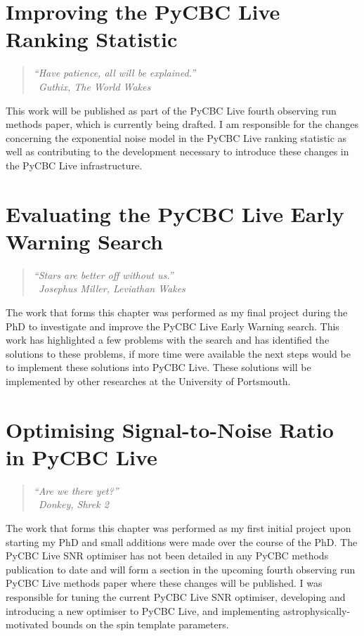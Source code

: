 \documentclass[a4paper,12pt,twoside]{report} %
\makeatletter
\newcommand{\chapterquote}[2]{
  \begin{quote}
    \color{darkgray}\itshape #1 \\[1ex] %
    \raggedleft %
    \textemdash\ #2
  \end{quote}
}
\renewcommand{\cleardoublepage}{%
  \clearpage%
  \if@twoside
    \ifodd\c@page
    \else
      \hbox{}%
      \thispagestyle{empty}%
      \newpage
    \fi
  \fi
}
\let\oldchapter\chapter
\renewcommand{\chapter}{\cleardoublepage\oldchapter}
\makeatother
\begin{document}
\chapter[Improving the PyCBC Live Ranking Statistic]{\label{chapter:5-pycbc-live}Improving the PyCBC Live Ranking Statistic}
\chapterquote{``Have patience, all will be explained.''}{Guthix, The World Wakes}
This work will be published as part of the PyCBC Live fourth observing run methods paper, which is currently being drafted. I am responsible for the changes concerning the exponential noise model in the PyCBC Live ranking statistic as well as contributing to the development necessary to introduce these changes in the PyCBC Live infrastructure.


\chapter[Evaluating the PyCBC Live Early Warning Search]{\label{chapter:6-earlywarning}Evaluating the PyCBC Live Early Warning Search}
\chapterquote{``Stars are better off without us.''}{Josephus Miller, Leviathan Wakes}
The work that forms this chapter was performed as my final project during the PhD to investigate and improve the PyCBC Live Early Warning search. This work has highlighted a few problems with the search and has identified the solutions to these problems, if more time were available the next steps would be to implement these solutions into PyCBC Live. These solutions will be implemented by other researches at the University of Portsmouth.


\chapter[Optimising Signal-to-Noise Ratio in PyCBC Live]{\label{chapter:7-snr-optimiser}Optimising Signal-to-Noise Ratio in PyCBC Live}
\chapterquote{``Are we there yet?''}{Donkey, Shrek 2}
The work that forms this chapter was performed as my first initial project upon starting my PhD and small additions were made over the course of the PhD. The PyCBC Live SNR optimiser has not been detailed in any PyCBC methods publication to date and will form a section in the upcoming fourth observing run PyCBC Live methods paper where these changes will be published. I was responsible for tuning the current PyCBC Live SNR optimiser, developing and introducing a new optimiser to PyCBC Live, and implementing astrophysically-motivated bounds on the spin template parameters.

\end{document}
